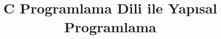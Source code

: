 \documentclass[a4paper,10pt]{book}
\title{C Programlama Dili ile Yapısal Programlama}
\begin{document}
\let\cleardoublepage\clearpage

\frontmatter %



\tableofcontents
\listoffigures
\listoftables
\mainmatter %

















\backmatter
\printindex
\end{document}
